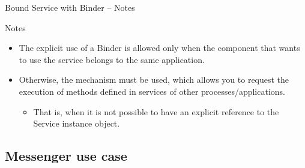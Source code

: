 \documentclass{beamer}
\begin{document}
    \begin{frame}{Bound Service with Binder -- Notes}
      \begin{block}{Notes}
        \begin{itemize}\itemsep20pt
          \item The explicit use of a Binder is allowed only when the component
          that wants to use the service belongs to the same application.
          \item Otherwise, the  mechanism must be used, which allows
          you to request the execution of methods defined in services of other
          processes/applications.
          \begin{itemize}
            \item That is, when it is not possible to have an explicit reference
            to the Service instance object. 
          \end{itemize}
        \end{itemize}
      \end{block}
  \end{frame}

\subsection{Messenger use case}
\end{document}
